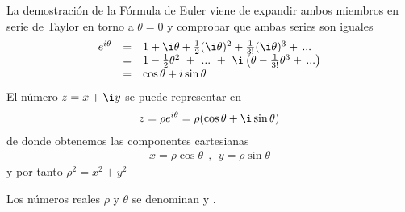 \documentclass[letterpaper,10pt,english]{jupyterBook}
\begin{document}
\sphinxAtStartPar
La demostración de la Fórmula de Euler viene de expandir ambos miembros en serie de Taylor en torno a \(\theta = 0\) y comprobar que ambas series son iguales
\begin{equation*}
\begin{split}
\begin{array}{rcl}
e^{i\theta} &=& 1 + \i\theta + \frac{1}{2}(\i\theta)^2 + \frac{1}{3!}(\i\theta)^3+\, ... \\
    &=& 1 -\frac{1}{2}\theta^2 ~+~ ... ~+~ \i \left(\theta - \frac{1}{3!} \theta^3+ \, ...\right) \\
    &=& \cos \theta  + i \sin \theta 
\end{array} 
\end{split}
\end{equation*}
\sphinxAtStartPar
El número \(z=x + \i y\) se puede representar en 
\begin{equation*}
\begin{split}
z = \rho e^{i\theta} = \rho (\cos\theta + \i \sin\theta)  
\end{split}
\end{equation*}
\sphinxAtStartPar
de donde obtenemos las componentes cartesianas
\begin{equation*}
\begin{split}x=\rho\cos\theta ~~,~~y=\rho\sin\theta\end{split}
\end{equation*}
\sphinxAtStartPar
y por tanto \(\rho^2 = x^2 + y^2\)

\sphinxAtStartPar
Los números reales \(\rho\) y \(\theta\) se denominan  y .
\end{document}
